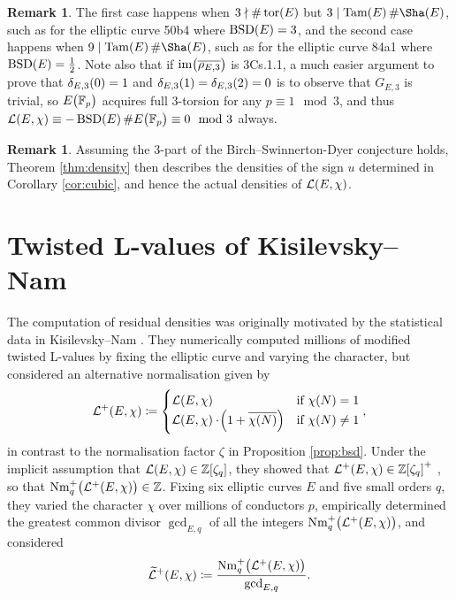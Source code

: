 \documentclass{article}
\theoremstyle{plain}
\theoremstyle{definition}
\newtheorem{remark}[n]{Remark}
\newcommand{\BSD}{\operatorname{BSD}}
\newcommand{\FF}{\mathbb{F}}
\newcommand{\im}{\operatorname{im}}
\newcommand{\LLL}{\mathcal{L}}
\newcommand{\Nm}{\operatorname{Nm}}
\newcommand{\Tam}{\operatorname{Tam}}
\newcommand{\tor}{\operatorname{tor}}
\newcommand{\ZZ}{\mathbb{Z}}
\newcommand{\br}{\!\del}
\begin{document}
\begin{remark}
The first case happens when $ 3 \nmid \#\tor\br{E} $ but $ 3 \mid \Tam\br{E}\#\Sha\br{E} $, such as for the elliptic curve 50b4 where $ \BSD\br{E} = 3 $, and the second case happens when $ 9 \mid \Tam\br{E}\#\Sha\br{E} $, such as for the elliptic curve 84a1 where $ \BSD\br{E} = \tfrac{1}{2} $. Note also that if $ \im\br{\overline{\rho_{E, 3}}} $ is 3Cs.1.1, a much easier argument to prove that $ \delta_{E, 3}\br{0} = 1 $ and $ \delta_{E, 3}\br{1} = \delta_{E, 3}\br{2} = 0 $ is to observe that $ G_{E, 3} $ is trivial, so $ E\br{\FF_p} $ acquires full $ 3 $-torsion for any $ p \equiv 1 \mod 3 $, and thus $ \LLL\br{E, \chi} \equiv -\BSD\br{E}\#E\br{\FF_p} \equiv 0 \mod 3 $ always.
\end{remark}

\begin{remark}
Assuming the $ 3 $-part of the Birch--Swinnerton-Dyer conjecture holds, Theorem \ref{thm:density} then describes the densities of the sign $ u $ determined in Corollary \ref{cor:cubic}, and hence the actual densities of $ \LLL\br{E, \chi} $.
\end{remark}

\pagebreak

\section{Twisted L-values of Kisilevsky--Nam}

\label{sec:kn22}

The computation of residual densities was originally motivated by the statistical data in Kisilevsky--Nam \cite[Section 7]{KN22}. They numerically computed millions of modified twisted L-values by fixing the elliptic curve and varying the character, but considered an alternative normalisation given by
$$ \LLL^+\br{E, \chi} \coloneqq
\begin{cases}
\LLL\br{E, \chi} & \text{if} \ \chi\br{N} = 1 \\
\LLL\br{E, \chi} \cdot \br{1 + \overline{\chi\br{N}}} & \text{if} \ \chi\br{N} \ne 1
\end{cases},
$$
in contrast to the normalisation factor $ \zeta $ in Proposition \ref{prop:bsd}. Under the implicit assumption that $ \LLL\br{E, \chi} \in \ZZ\sbr[0]{\zeta_q} $, they showed that $ \LLL^+\br{E, \chi} \in \ZZ\sbr[0]{\zeta_q}^+ $ \cite[Proposition 2.1]{KN22}, so that $ \Nm_q^+\br{\LLL^+\br{E, \chi}} \in \ZZ $. Fixing six elliptic curves $ E $ and five small orders $ q $, they varied the character $ \chi $ over millions of conductors $ p $, empirically determined the greatest common divisor $ \gcd_{E, q} $ of all the integers $ \Nm_q^+\br{\LLL^+\br{E, \chi}} $, and considered
$$ \widetilde{\LLL}^+\br{E, \chi} \coloneqq \dfrac{\Nm_q^+\br{\LLL^+\br{E, \chi}}}{\gcd_{E, q}}. $$
\end{document}

